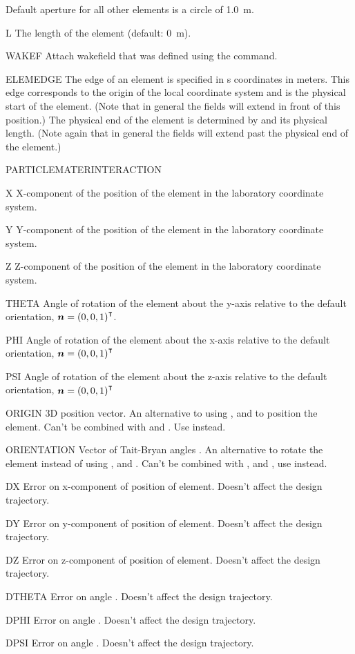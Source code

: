 \begin{kdescription}
  Default aperture for all other elements is a circle of \SI{1.0}{\meter}.

\item[L]
  The length of the element (default: \SI{0}{\meter}).
\item[WAKEF]
  Attach wakefield that was defined using the  command.
\item[ELEMEDGE]
    The edge of an element is specified in s coordinates in meters. This edge corresponds to the origin of the local coordinate system and is the physical start of the element. (Note that in general the fields will extend in front of this position.) The physical end of the element is determined by  and its physical length. (Note again that in general the fields will extend past the physical end of the element.)
\item[PARTICLEMATERINTERACTION]
\item[X]
  X-component of the position of the element in the laboratory coordinate system.
\item[Y]
  Y-component of the position of the element in the laboratory coordinate system.
\item[Z]
  Z-component of the position of the element in the laboratory coordinate system.
\item[THETA]
  Angle of rotation of the element about the y-axis relative to the default orientation, ${\bm{n}} = \left(0, 0, 1\right)^\intercal$.
\item[PHI]
  Angle of rotation of the element about the x-axis relative to the default orientation, ${\bm{n}} = \left(0, 0, 1\right)^\intercal$ \item[PSI]
  Angle of rotation of the element about the z-axis relative to the default orientation, ${\bm{n}} = \left(0, 0, 1\right)^\intercal$ \item[ORIGIN]
  3D position vector. An alternative to using ,  and  to position the element. Can't be combined with  and . Use  instead.
\item[ORIENTATION]
  Vector of Tait-Bryan angles \cite{bib:tait-bryan}. An alternative to rotate the element instead of using ,  and . Can't be combined with ,  and , use  instead.
\item[DX]
  Error on x-component of position of element. Doesn't affect the design trajectory.
\item[DY]
  Error on y-component of position of element. Doesn't affect the design trajectory.
\item[DZ]
  Error on z-component of position of element. Doesn't affect the design trajectory.
\item[DTHETA]
  Error on angle . Doesn't affect the design trajectory.
\item[DPHI]
  Error on angle . Doesn't affect the design trajectory.
\item[DPSI]
  Error on angle . Doesn't affect the design trajectory.


\end{kdescription}
